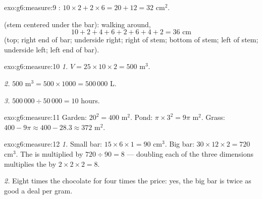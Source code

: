 \begin{solution}{exo:g6:measure:9}
: $10 \times 2 + 2 \times 6 = 20 + 12 = 32$ cm$^2$.

 (stem centered under the bar): walking around,
\[
10 + 2 + 4 + 6 + 2 + 6 + 4 + 2 = 36 \text{ cm}
\]
(top; right end of bar; underside right; right of stem; bottom of
stem; left of stem; underside left; left end of bar).
\end{solution}

\begin{solution}{exo:g6:measure:10}
\emph{1.} $V = 25 \times 10 \times 2 = 500$ m$^3$.

\emph{2.} $500$ m$^3 = 500 \times 1000 = 500\,000$ L.

\emph{3.} $500\,000 \div 50\,000 = 10$ hours.
\end{solution}

\begin{solution}{exo:g6:measure:11}
Garden: $20^2 = 400$ m$^2$. Pond: $\pi \times 3^2 = 9\pi$ m$^2$.
Grass: $400 - 9\pi \approx 400 - 28.3 \approx 372$ m$^2$.
\end{solution}

\begin{solution}{exo:g6:measure:12}
\emph{1.} Small bar: $15 \times 6 \times 1 = 90$ cm$^3$. Big bar:
$30 \times 12 \times 2 = 720$ cm$^3$. The  is multiplied by
$720 \div 90 = 8$ --- doubling each of the three dimensions multiplies
the  by $2 \times 2 \times 2 = 8$.

\emph{2.} Eight times the chocolate for four times the price: yes, the
big bar is twice as good a deal per gram.
\end{solution}

